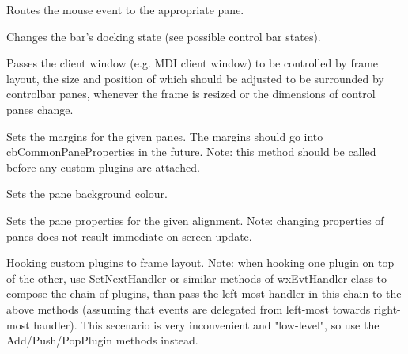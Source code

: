 Routes the mouse event to the appropriate pane.


\label{wxframelayoutsetbarstate}


Changes the bar's docking state (see possible control bar states).


\label{wxframelayoutsetframeclient}


Passes the client window (e.g. MDI client window) to be controlled by
frame layout, the size and position of which should be adjusted to be
surrounded by controlbar panes, whenever the frame is resized or the dimensions
of control panes change.


\label{wxframelayoutsetmargins}


Sets the margins for the given panes.
The margins should go into cbCommonPaneProperties in the future.
Note: this method should be called before any custom plugins are attached.


\label{wxframelayoutsetpanebackground}


Sets the pane background colour.


\label{wxframelayoutsetpaneproperties}


Sets the pane properties for the given alignment.
Note: changing properties of panes does not result immediate on-screen update.


\label{wxframelayoutsettopplugin}


Hooking custom plugins to frame layout.
Note: when hooking one plugin on top of the other,
use SetNextHandler or similar methods
of wxEvtHandler class to compose the chain of plugins,
than pass the left-most handler in this chain to
the above methods (assuming that events are delegated
from left-most towards right-most handler).
This secenario is very inconvenient and "low-level",
so use the Add/Push/PopPlugin methods instead.


